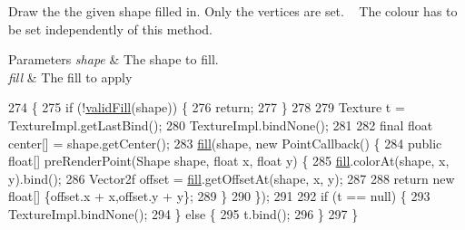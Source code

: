 Draw the the given shape filled in. Only the vertices are set. ~\newline
The colour has to be set independently of this method.


\begin{DoxyParams}{Parameters}
{\em shape} & The shape to fill. \\
\hline
{\em fill} & The fill to apply \\
\hline
\end{DoxyParams}

\begin{DoxyCode}
274                                                                            \{
275         \textcolor{keywordflow}{if} (!\mbox{\hyperlink{classorg_1_1newdawn_1_1slick_1_1geom_1_1_shape_renderer_a1e630761b7f3631a05e0eb8e9d9ce091}{validFill}}(shape)) \{
276             \textcolor{keywordflow}{return};
277         \}
278         
279         Texture t = TextureImpl.getLastBind();
280         TextureImpl.bindNone();
281 
282         \textcolor{keyword}{final} \textcolor{keywordtype}{float} center[] = shape.getCenter();
283         \mbox{\hyperlink{classorg_1_1newdawn_1_1slick_1_1geom_1_1_shape_renderer_a798dd59aef1deb87fdfcc4fbff59ecef}{fill}}(shape, \textcolor{keyword}{new} PointCallback() \{
284             \textcolor{keyword}{public} \textcolor{keywordtype}{float}[] preRenderPoint(Shape shape, \textcolor{keywordtype}{float} x, \textcolor{keywordtype}{float} y) \{
285                 \mbox{\hyperlink{classorg_1_1newdawn_1_1slick_1_1geom_1_1_shape_renderer_a798dd59aef1deb87fdfcc4fbff59ecef}{fill}}.colorAt(shape, x, y).bind();
286                 Vector2f offset = \mbox{\hyperlink{classorg_1_1newdawn_1_1slick_1_1geom_1_1_shape_renderer_a798dd59aef1deb87fdfcc4fbff59ecef}{fill}}.getOffsetAt(shape, x, y);
287                 
288                 \textcolor{keywordflow}{return} \textcolor{keyword}{new} \textcolor{keywordtype}{float}[] \{offset.x + x,offset.y + y\};
289             \}
290         \});
291         
292         \textcolor{keywordflow}{if} (t == null) \{
293             TextureImpl.bindNone();
294         \} \textcolor{keywordflow}{else} \{
295             t.bind();
296         \}
297     \}
\end{DoxyCode}
\mbox{\label{classorg_1_1newdawn_1_1slick_1_1geom_1_1_shape_renderer_ad2056c37d2e8613c99ee10c3c3ea5e96}} 
